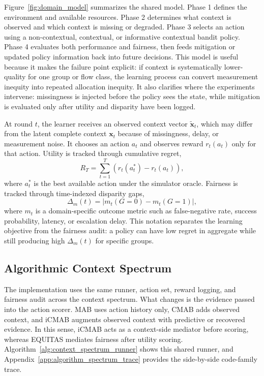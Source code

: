 \documentclass[conference]{IEEEtran}
\begin{document}
Figure~\ref{fig:domain_model} summarizes the shared model. Phase 1 defines
the environment and available resources. Phase 2 determines what context is
observed and which context is missing or degraded. Phase 3 selects an action
using a non-contextual, contextual, or informative contextual bandit policy.
Phase 4 evaluates both performance and fairness, then feeds mitigation or
updated policy information back into future decisions. This model is useful
because it makes the failure point explicit: if context is systematically
lower-quality for one group or flow class, the learning process can convert
measurement inequity into repeated allocation inequity. It also clarifies where
the experiments intervene: missingness is injected before the policy sees the
state, while mitigation is evaluated only after utility and disparity have been
logged.

At round $t$, the learner receives an observed context vector
$\tilde{\mathbf{x}}_t$, which may differ from the latent complete context
$\mathbf{x}_t$ because of missingness, delay, or measurement noise. It chooses
an action $a_t$ and observes reward $r_t(a_t)$ only for that action. Utility is
tracked through cumulative regret,
\begin{equation}
R_T = \sum_{t=1}^{T} \left(r_t(a_t^*) - r_t(a_t)\right),
\label{eq:regret}
\end{equation}
where $a_t^*$ is the best available action under the simulator oracle.
Fairness is tracked through time-indexed disparity gaps,
\begin{equation}
\Delta_m(t) =
\left|m_t(G=0) - m_t(G=1)\right|,
\label{eq:gap}
\end{equation}
where $m_t$ is a domain-specific outcome metric such as false-negative rate,
success probability, latency, or escalation delay. This notation separates the
learning objective from the fairness audit: a policy can have low regret in
aggregate while still producing high $\Delta_m(t)$ for specific groups.

\subsection{Algorithmic Context Spectrum}
\label{sec:algorithmic_context_spectrum}

The implementation uses the same runner, action set, reward logging, and
fairness audit across the context spectrum. What changes is the evidence
passed into the action scorer. MAB uses action history only, CMAB adds observed
context, and iCMAB augments observed context with predictive or recovered
evidence. In this sense, iCMAB acts as a context-side mediator before scoring,
whereas EQUITAS mediates fairness after utility scoring. Algorithm~\ref{alg:context_spectrum_runner}
shows this shared runner, and Appendix~\ref{app:algorithm_spectrum_trace}
provides the side-by-side code-family trace.
\end{document}
